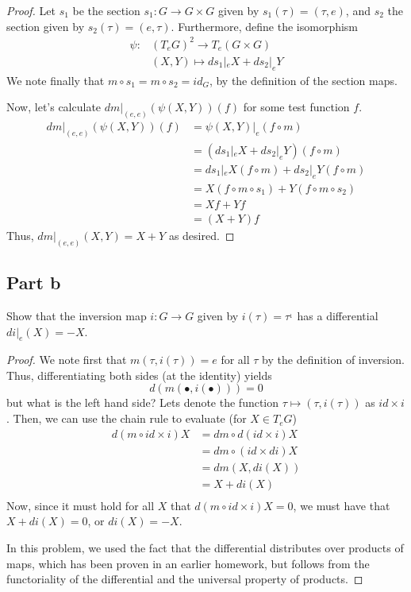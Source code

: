 \documentclass[fontsize=11pt]{scrartcl} %
\numberwithin{equation}{section} %
\numberwithin{figure}{section} %
\numberwithin{table}{section} %
\begin{document}
\begin{proof}
    Let $s_1$ be the section $s_1:G\to G\times G$ given by $s_1(\tau) =
    (\tau,e)$, and $s_2$ the section given by $s_2(\tau) = (e,\tau)$.
    Furthermore, define the isomorphism
    \[
        \begin{aligned}
            \psi: &(T_eG)^2\to T_e(G\times G)\\
                  &(X,Y) \mapsto ds_1|_eX + ds_2|_eY
        \end{aligned}
    \]
    We note finally that $m\circ s_1 = m\circ s_2 = id_G$, by the definition of
    the section maps.

    Now, let's calculate $dm|_{(e,e)}(\psi(X,Y))(f)$ for some test function $f$.
    \[
        \begin{aligned}
            dm|_{(e,e)}(\psi(X,Y))(f) &= \psi(X,Y)|_e(f\circ m)\\
                    &=(ds_1|_eX+ds_2|_eY)(f\circ m)\\
                    &=ds_1|_eX(f\circ m) + ds_2|_eY(f\circ m)\\
                    &=X(f\circ m\circ s_1) + Y(f\circ m\circ s_2)\\
                    &=Xf + Yf\\
                    &=(X+Y)f
        \end{aligned}
    \]
    Thus, $dm|_{(e,e)}(X,Y)=X+Y$ as desired.
\end{proof}

\subsection*{Part b}
Show that the inversion map $i:G\to G$ given by $i(\tau)=\tau^{_1}$ has a
differential $di|_e(X)=-X$.
\\
\begin{proof}
    We note first that $m(\tau,i(\tau))=e$ for all $\tau$ by the definition of
    inversion. Thus, differentiating both sides (at the identity) yields
    \[
        d(m(\bullet,i(\bullet))) = 0
    \]
    but what is the left hand side? Lets denote the function
    $\tau\mapsto(\tau,i(\tau))$ as $id\times i$. Then, we can
    use the chain rule to evaluate (for $X\in T_eG$)
    \[
        \begin{aligned}
            d(m\circ id\times i)X &= dm\circ d(id\times i)X\\
                                &= dm\circ (id\times di)X\\
                                &= dm(X,di(X))\\
                                &= X+di(X)\\
        \end{aligned}
    \]
    Now, since it must hold for all $X$ that $d(m\circ id\times i)X =0$,
    we must have that $X+di(X) =0$, or $di(X) = -X$.

    In this problem, we used the fact that the differential distributes over
    products of maps, which has been proven in an earlier homework, but follows
    from the functoriality of the differential and the universal property of
    products.
\end{proof}
\end{document}

